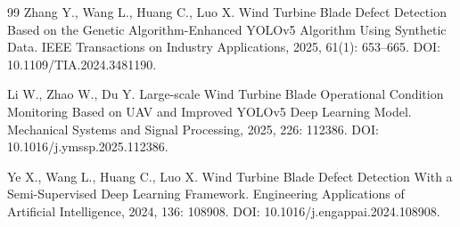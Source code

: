 \documentclass[UTF8,zihao=-4,a4paper]{ctexrep}
\begin{document}
\begin{thebibliography}{99}
Zhang Y., Wang L., Huang C., Luo X. Wind Turbine Blade Defect Detection Based on the Genetic Algorithm-Enhanced YOLOv5 Algorithm Using Synthetic Data. IEEE Transactions on Industry Applications, 2025, 61(1): 653--665. DOI: 10.1109/TIA.2024.3481190.

Li W., Zhao W., Du Y. Large-scale Wind Turbine Blade Operational Condition Monitoring Based on UAV and Improved YOLOv5 Deep Learning Model. Mechanical Systems and Signal Processing, 2025, 226: 112386. DOI: 10.1016/j.ymssp.2025.112386.

Ye X., Wang L., Huang C., Luo X. Wind Turbine Blade Defect Detection With a Semi-Supervised Deep Learning Framework. Engineering Applications of Artificial Intelligence, 2024, 136: 108908. DOI: 10.1016/j.engappai.2024.108908.

\end{thebibliography}
\end{document}
